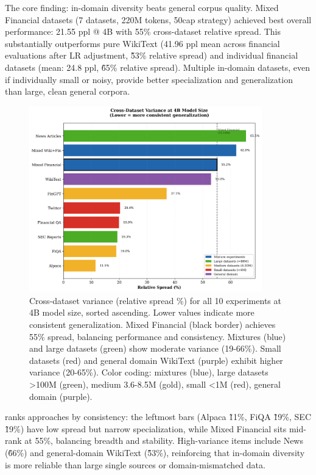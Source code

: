 The core finding: in-domain diversity beats general corpus quality. Mixed Financial datasets (7 datasets, 220M tokens, 50cap strategy) achieved best overall performance: 21.55 ppl @ 4B with 55\% cross-dataset relative spread. This substantially outperforms pure WikiText (41.96 ppl mean across financial evaluations after LR adjustment, \~53\% relative spread) and individual financial datasets (mean: 24.8 ppl, \~65\% relative spread). Multiple in-domain datasets, even if individually small or noisy, provide better specialization and generalization than large, clean general corpora.

\begin{figure}[h]
\centering
\includegraphics[width=0.9\textwidth]{figures/bar_variance.png}
\caption[Cross-Dataset Variance Comparison]{Cross-dataset variance (relative spread \%) for all 10 experiments at 4B model size, sorted ascending. Lower values indicate more consistent generalization. Mixed Financial (black border) achieves 55\% spread, balancing performance and consistency. Mixtures (blue) and large datasets (green) show moderate variance (19-66\%). Small datasets (red) and general domain WikiText (purple) exhibit higher variance (20-65\%). Color coding: mixtures (blue), large datasets >100M (green), medium 3.6-8.5M (gold), small <1M (red), general domain (purple).}
\label{fig:bar_variance}
\end{figure}

 ranks approaches by consistency: the leftmost bars (Alpaca \~11\%, FiQA \~19\%, SEC \~19\%) have low spread but narrow specialization, while Mixed Financial sits mid-rank at 55\%, balancing breadth and stability. High-variance items include News (\~66\%) and general-domain WikiText (\~53\%), reinforcing that in-domain diversity is more reliable than large single sources or domain-mismatched data.

